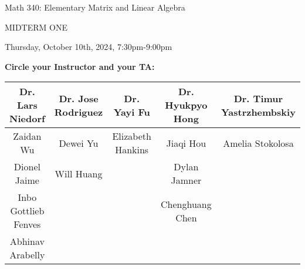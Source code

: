\documentclass[12pt]{extarticle}
\begin{document}
\LARGE{Math 340: Elementary Matrix and Linear Algebra}

\bigskip

\Huge{MIDTERM ONE} \normalsize

\bigskip

Thursday, October 10th, 2024, 7:30pm-9:00pm
\vspace{.12in}

\textbf{Circle your Instructor and your TA:}

\begin{table}[h]\centering \small
\begin{tabular}{|c|c|c|c|c|}
\hline
Dr. Lars Niedorf &  Dr. Jose Rodriguez & Dr. Yayi Fu & Dr. Hyukpyo Hong & Dr. Timur Yastrzhembskiy \\ \hline
Zaidan Wu & Dewei Yu & Elizabeth Hankins & Jiaqi Hou & Amelia Stokolosa \\ \hline
Dionel Jaime & Will Huang & & Dylan Jamner & \\ \hline
Inbo Gottlieb Fenves & & & Chenghuang Chen & \\ \hline
 Abhinav Arabelly & & & & \\ \hline
\end{tabular}
\end{table}






\vspace{-.2in}
\end{document}

